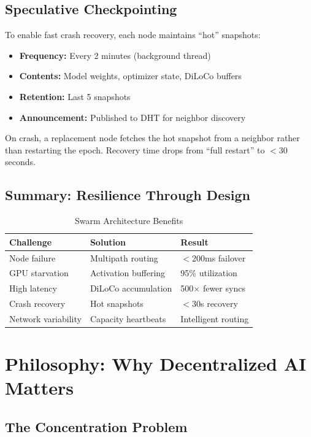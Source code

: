 \documentclass[11pt,a4paper]{article}
\begin{document}
\subsection{Speculative Checkpointing}

To enable fast crash recovery, each node maintains ``hot'' snapshots:

\begin{itemize}
    \item \textbf{Frequency:} Every 2 minutes (background thread)
    \item \textbf{Contents:} Model weights, optimizer state, DiLoCo buffers
    \item \textbf{Retention:} Last 5 snapshots
    \item \textbf{Announcement:} Published to DHT for neighbor discovery
\end{itemize}

On crash, a replacement node fetches the hot snapshot from a neighbor rather than restarting the epoch. Recovery time drops from ``full restart'' to $<30$ seconds.

\subsection{Summary: Resilience Through Design}

\begin{table}[H]
\centering
\caption{Swarm Architecture Benefits}
\begin{tabular}{@{}lll@{}}
\toprule
\textbf{Challenge} & \textbf{Solution} & \textbf{Result} \\
\midrule
Node failure & Multipath routing & $<$200ms failover \\
GPU starvation & Activation buffering & 95\% utilization \\
High latency & DiLoCo accumulation & 500$\times$ fewer syncs \\
Crash recovery & Hot snapshots & $<$30s recovery \\
Network variability & Capacity heartbeats & Intelligent routing \\
\bottomrule
\end{tabular}
\end{table}

\section{Philosophy: Why Decentralized AI Matters}

\subsection{The Concentration Problem}
\end{document}
